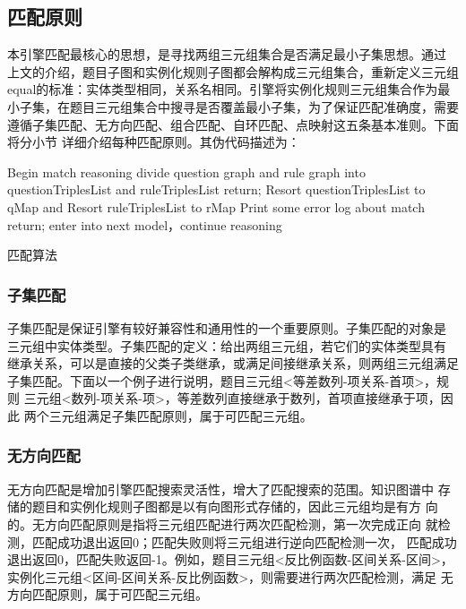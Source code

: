 \documentclass{standalone}
\begin{document}
\subsection{匹配原则}
本引擎匹配最核心的思想，是寻找两组三元组集合是否满足最小子集思想。通过
上文的介绍，题目子图和实例化规则子图都会解构成三元组集合，重新定义三元组
equal的标准：实体类型相同，关系名相同。引擎将实例化规则三元组集合作为最
小子集，在题目三元组集合中搜寻是否覆盖最小子集，为了保证匹配准确度，需要
遵循子集匹配、无方向匹配、组合匹配、自环匹配、点映射这五条基本准则。下面将分小节
详细介绍每种匹配原则。其伪代码描述为：
\begin{algorithm}[H]
    Begin match reasoning\;
	\quad divide question graph and rule graph into 
	\\questionTriplesList and ruleTriplesList\;
	 {
		return;
    }
	Resort questionTriplesList to qMap and Resort ruleTriplesList to rMap\;
		 {
			Print some error log about match\;
			return;
    }{
		enter into next model，continue reasoning\;
	}  
	
	\caption{匹配算法}
	\label{dfs}
\end{algorithm}
\subsubsection{子集匹配}
子集匹配是保证引擎有较好兼容性和通用性的一个重要原则。子集匹配的对象是
三元组中实体类型。子集匹配的定义：给出两组三元组，若它们的实体类型具有
继承关系，可以是直接的父类子类继承，或满足间接继承关系，则两组三元组满足
子集匹配。下面以一个例子进行说明，题目三元组<等差数列-项关系-首项>，规则
三元组<数列-项关系-项>，等差数列直接继承于数列，首项直接继承于项，因此
两个三元组满足子集匹配原则，属于可匹配三元组。
\subsubsection{无方向匹配}
无方向匹配是增加引擎匹配搜索灵活性，增大了匹配搜索的范围。知识图谱中
存储的题目和实例化规则子图都是以有向图形式存储的，因此三元组均是有方
向的。无方向匹配原则是指将三元组匹配进行两次匹配检测，第一次完成正向
就检测，匹配成功退出返回0；匹配失败则将三元组进行逆向匹配检测一次，
匹配成功退出返回0，匹配失败返回-1。例如，题目三元组<反比例函数-区间关系-区间>，
实例化三元组<区间-区间关系-反比例函数>，则需要进行两次匹配检测，满足
无方向匹配原则，属于可匹配三元组。
\end{document}
